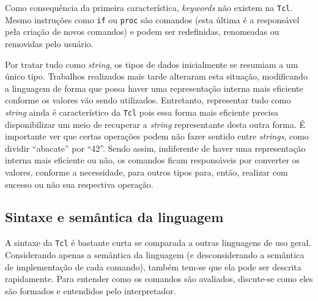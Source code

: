 Como consequência da primeira característica, \textit{keywords} não
existem na \texttt{Tcl}. Mesmo instruções como
\verb!if! ou \verb!proc! são comandos (esta última é a responsável
pela criação de novos comandos) e podem ser redefinidas, renomeadas ou
removidas pelo usuário.

Por tratar tudo como \textit{string}, os tipos de dados inicialmente
se resumiam a um único tipo. Trabalhos realizados mais tarde
\cite{sah_tc}\cite{tcl_bytecode} alteraram esta situação, modificando
a linguagem de forma que possa
haver uma representação interna mais eficiente conforme os valores vão
sendo utilizados. Entretanto, representar tudo como \textit{string} ainda
é característico da \texttt{Tcl} pois essa forma mais eficiente
precisa disponibilizar um meio de recuperar a \textit{string}
representante desta outra forma. É importante ver que certas
operações podem não fazer sentido entre \textit{strings}, como dividir
``abacate'' por ``42''. Sendo assim, indiferente de haver uma
representação interna mais eficiente ou não, os comandos ficam responsáveis
por converter os valores, conforme a necessidade, para outros
tipos para, então, realizar com sucesso ou não sua respectiva operação.



\subsection{Sintaxe e semântica da linguagem}

A sintaxe da \texttt{Tcl} é bastante curta se comparada a outras linguagens
de uso geral. Considerando apenas a semântica da linguagem (e
desconsiderando a semântica de implementação de cada comando), também
tem-se que ela pode ser descrita rapidamente. Para entender como os
comandos são avaliados, discute-se como eles são
formados e entendidos pelo interpretador.

